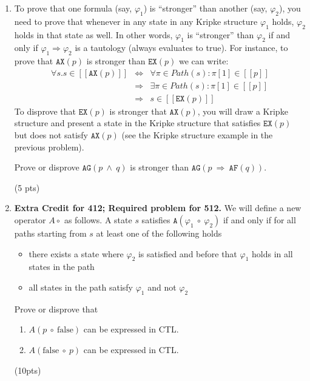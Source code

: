 \documentclass[11pt]{article}
\newcommand{\ax}[1]{\texttt{AX}(#1)}
\newcommand{\ex}[1]{\texttt{EX}(#1)}
\newcommand{\af}[1]{\texttt{AF}(#1)}
\newcommand{\ag}[1]{\texttt{AG}(#1)}
\newcommand{\sem}[1]{[\!\![#1]\!\!]}
\begin{document}
\begin{enumerate}
\item
To prove that one formula (say, $\varphi_1$) is ``stronger'' than
another (say, $\varphi_2$), you need to prove that whenever in any
state in any Kripke structure $\varphi_1$ holds, $\varphi_2$ holds in
that state as well. In other words, $\varphi_1$ is ``stronger'' than
$\varphi_2$ if and only if $\varphi_1\Rightarrow\varphi_2$ is a
tautology (always evaluates to true). For instance, to prove that
$\ax{p}$ is stronger than $\ex{p}$ we can write:
\[
\begin{array}{rcl}
  \forall s. s\in \sem{\ax{p}} & \Leftrightarrow & \forall \pi\in Path(s): \pi[1] \in \sem{p} \\
                               & \Rightarrow &     \exists \pi\in Path(s): \pi[1] \in \sem{p} \\
                               & \Rightarrow & s \in \sem{\ex{p}}
\end{array}
\]
To disprove that $\ex{p}$ is stronger that $\ax{p}$, you will draw a
Kripke structure and present a state in the Kripke structure that
satisfies $\ex{p}$ but does not satisfy $\ax{p}$ (see the Kripke
structure example in the previous problem).

Prove or disprove $\ag{p\ \land\ q}$ is stronger than $\ag{p\ \Rightarrow\ \af{q}}$.


\hfill (5 pts)

\item \textbf{Extra Credit for 412; Required problem for 512.}
  We will define a new operator $A\circ$
  as follows. A state $s$ satisfies $\texttt{A}(\varphi_1\ \circ\ \varphi_2)$
  if and only if for all paths starting from $s$ at least one of the
  following holds
\begin{itemize}
\item there exists a state where $\varphi_2$ is
  satisfied and before that $\varphi_1$ holds in all states in the
  path
\item all states in the path satisfy $\varphi_1$ and not
  $\varphi_2$
\end{itemize}
Prove or disprove that 
\begin{enumerate}
\item $A(p\ \circ\ \mbox{false})$ can be expressed
  in CTL.

\item $A(\mbox{false}\ \circ\ p)$ can be expressed in CTL.

\end{enumerate}
\hfill(10pts)




\end{enumerate}
\end{document}
